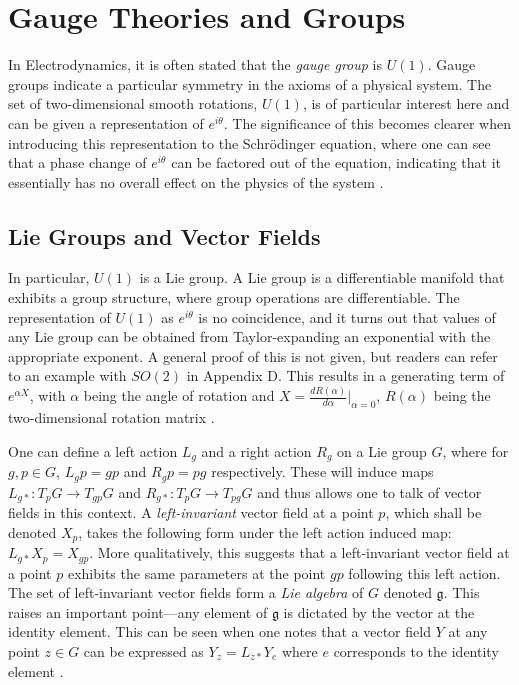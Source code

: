 \documentclass[fleqn, twocolumn, 10pt]{article}
\begin{document}

\section{Gauge Theories and Groups}

In Electrodynamics, it is often stated that the \textit{gauge group} is $U(1)$. Gauge groups indicate a particular symmetry in the axioms of a physical system. The set of two-dimensional smooth rotations, $U(1)$, is of particular interest here and can be given a representation of $e^{i\theta}$. The significance of this becomes clearer when introducing this representation to the Schr\"odinger equation, where one can see that a phase change of $e^{i\theta}$ can be factored out of the equation, indicating that it essentially has no overall effect on the physics of the system \cite{bob2017purdy}.

\subsection{Lie Groups and Vector Fields}

In particular, $U(1)$ is a Lie group. A Lie group is a differentiable manifold that exhibits a group structure, where group operations are differentiable. The representation of $U(1)$ as $e^{i\theta}$ is no coincidence, and it turns out that values of any Lie group can be obtained from Taylor-expanding an exponential with the appropriate exponent. A general proof of this is not given, but readers can refer to an example with $SO(2)$ in Appendix D. This results in a generating term of $e^{\alpha X}$, with $\alpha$ being the angle of rotation and $X = \frac{dR(\alpha)}{d\alpha} \biggr\rvert_{\alpha = 0}$, $R(\alpha)$ being the two-dimensional rotation matrix \cite{b2001russell}.

One can define a left action $L_g$ and a right action $R_g$ on a Lie group $G$, where for $g,p \in G$, $L_gp = gp$ and $R_gp = pg$ respectively. These will induce maps $L_{g*}: T_pG \to T_{gp}G$ and $R_{g*}: T_pG \to T_{pg}G$ and thus allows one to talk of vector fields in this context. A \textit{left-invariant} vector field at a point $p$, which shall be denoted $X_{p}$, takes the following form under the left action induced map: $L_{g*}X_{p} = X_{gp}$. More qualitatively, this suggests that a left-invariant vector field at a point $p$ exhibits the same parameters at the point $gp$ following this left action. The set of left-invariant vector fields form a \textit{Lie algebra} of $G$ denoted $\mathfrak{g}$. This raises an important point---any element of $\mathfrak{g}$ is dictated by the vector at the identity element. This can be seen when one notes that a vector field $Y$ at any point $z \in G$ can be expressed as $Y_{z} = L_{z*}Y_{e}$ where $e$ corresponds to the identity element \cite{bob2017purdy, nakahara2003geometry, kai2015lam}.
\end{document}
